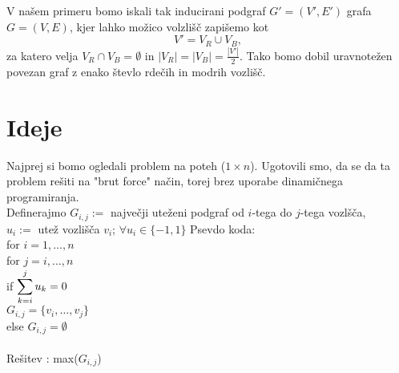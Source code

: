 \documentclass[a4paper, 11pt]{article}
\theoremstyle{definition}
\newcommand{\G}{\mathcal{G}}
\newcommand{\E}{\mathcal{E}}
\newcommand{\V}{\mathcal{V}}
\begin{document}
    V našem primeru bomo iskali tak inducirani podgraf $G' = (V', E')$ grafa $G = (V, E)$, kjer lahko možico volzlišč
    zapišemo kot 
        $$ V' = V_{R} \cup V_{B},$$
    za katero velja $ V_{R} \cap  V_{B} = \emptyset $ in $|V_{R}| = |V_{B}| = \frac{|V'|}{2}$. Tako bomo dobil
    uravnotežen povezan graf z enako števlo rdečih in modrih vozlišč.




    \section{Ideje}

    Najprej si bomo ogledali problem na poteh ($1 \times n $). Ugotovili smo, da se da ta problem rešiti 
    na "brut force" način, torej brez uporabe dinamičnega programiranja.\\
    Definerajmo $ G_{i,j} :=$ največji uteženi podgraf od $i$-tega do $j$-tega vozlšča,\\
    $u_{i} :=$ utež vozlišča $v_i$; $\forall u_{i} \in \{-1, 1\} $
    Psevdo koda:\\
    for $i= 1,\dots,n$\\
    for $j= i,\dots,n$\\
    if $ \mathlarger{\sum_{k=i}^{j}u_{k} = 0} $\\
    $ G_{i,j}  = \{v_i,\dots, v_j \}$ \\
    else $ G_{i,j}  = \emptyset$
    \\
    \\
    Rešitev : max($G_{i,j}$)
\end{document}
